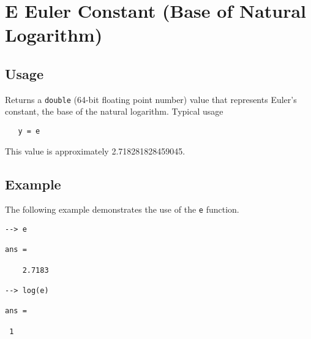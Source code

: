 \section{E Euler Constant (Base of Natural Logarithm)}

\subsection{Usage}

Returns a \verb|double| (64-bit floating point number) value that represents Euler's constant, the base of the natural logarithm.  Typical usage 
\begin{verbatim}
   y = e
\end{verbatim}
This value is approximately 2.718281828459045.
\subsection{Example}

The following example demonstrates the use of the \verb|e| function.
\begin{verbatim}
--> e

ans = 

    2.7183 

--> log(e)

ans = 

 1 
\end{verbatim}
